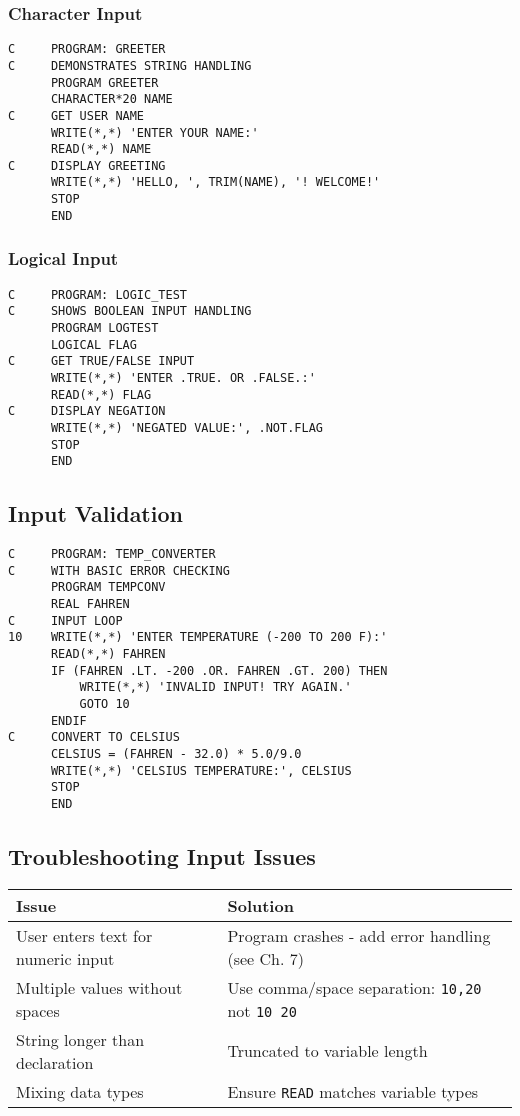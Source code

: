 \documentclass{book}
\begin{document}
\subsubsection*{Character Input}
\begin{verbatim}
C     PROGRAM: GREETER
C     DEMONSTRATES STRING HANDLING
      PROGRAM GREETER
      CHARACTER*20 NAME
C     GET USER NAME
      WRITE(*,*) 'ENTER YOUR NAME:'
      READ(*,*) NAME
C     DISPLAY GREETING
      WRITE(*,*) 'HELLO, ', TRIM(NAME), '! WELCOME!'
      STOP
      END
\end{verbatim}

\subsubsection*{Logical Input}
\begin{verbatim}
C     PROGRAM: LOGIC_TEST
C     SHOWS BOOLEAN INPUT HANDLING
      PROGRAM LOGTEST
      LOGICAL FLAG
C     GET TRUE/FALSE INPUT
      WRITE(*,*) 'ENTER .TRUE. OR .FALSE.:'
      READ(*,*) FLAG
C     DISPLAY NEGATION
      WRITE(*,*) 'NEGATED VALUE:', .NOT.FLAG
      STOP
      END
\end{verbatim}

\subsection*{Input Validation}
\begin{verbatim}
C     PROGRAM: TEMP_CONVERTER
C     WITH BASIC ERROR CHECKING
      PROGRAM TEMPCONV
      REAL FAHREN
C     INPUT LOOP
10    WRITE(*,*) 'ENTER TEMPERATURE (-200 TO 200 F):'
      READ(*,*) FAHREN
      IF (FAHREN .LT. -200 .OR. FAHREN .GT. 200) THEN
          WRITE(*,*) 'INVALID INPUT! TRY AGAIN.'
          GOTO 10
      ENDIF
C     CONVERT TO CELSIUS
      CELSIUS = (FAHREN - 32.0) * 5.0/9.0
      WRITE(*,*) 'CELSIUS TEMPERATURE:', CELSIUS
      STOP
      END
\end{verbatim}

\subsection*{Troubleshooting Input Issues}
\begin{center}
\begin{tabular}{|p{4cm}|p{8cm}|}
\hline
\textbf{Issue} & \textbf{Solution} \\ 
\hline
User enters text for numeric input & Program crashes - add error handling (see Ch. 7) \\
\hline
Multiple values without spaces & Use comma/space separation: \texttt{10,20} not \texttt{10 20} \\
\hline
String longer than declaration & Truncated to variable length \\
\hline
Mixing data types & Ensure \texttt{READ} matches variable types \\
\hline
\end{tabular}
\end{center}
\end{document}
